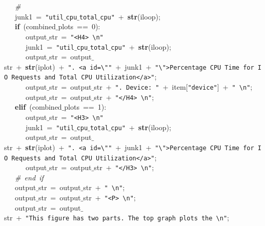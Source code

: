 \mbox{}\ \ \ \textit{\#} \\
\mbox{}\ \ \ junk1\ =\ \texttt{"{}util$\_$cpu$\_$total$\_$cpu"{}}\ +\ \textbf{str}(iloop); \\
\mbox{}\ \ \ \textbf{if}\ (combined$\_$plots\ ==\ 0): \\
\mbox{}\ \ \ \ \ \ output$\_$str\ =\ \texttt{"{}\textless{}H4\textgreater{}\ \textbackslash{}n"{}} \\
\mbox{}\ \ \ \ \ \ junk1\ =\ \texttt{"{}util$\_$cpu$\_$total$\_$cpu"{}}\ +\ \textbf{str}(iloop); \\
\mbox{}\ \ \ \ \ \ output$\_$str\ =\ output$\_$str\ +\ \textbf{str}(iplot)\ +\ \texttt{"{}.\ \textless{}a\ id=\textbackslash{}"{}"{}}\ +\ junk1\ +\ \texttt{"{}\textbackslash{}"{}\textgreater{}Percentage\ CPU\ Time\ for\ IO\ Requests\ and\ Total\ CPU\ Utilization\textless{}/a\textgreater{}"{}}; \\
\mbox{}\ \ \ \ \ \ output$\_$str\ =\ output$\_$str\ +\ \texttt{"{}.\ Device:\ "{}}\ +\ item[\texttt{"{}device"{}}]\ +\ \texttt{"{}\ \textbackslash{}n"{}}; \\
\mbox{}\ \ \ \ \ \ output$\_$str\ =\ output$\_$str\ +\ \texttt{"{}\textless{}/H4\textgreater{}\ \textbackslash{}n"{}}; \\
\mbox{}\ \ \ \textbf{elif}\ (combined$\_$plots\ ==\ 1): \\
\mbox{}\ \ \ \ \ \ output$\_$str\ =\ \texttt{"{}\textless{}H3\textgreater{}\ \textbackslash{}n"{}} \\
\mbox{}\ \ \ \ \ \ junk1\ =\ \texttt{"{}util$\_$cpu$\_$total$\_$cpu"{}}\ +\ \textbf{str}(iloop); \\
\mbox{}\ \ \ \ \ \ output$\_$str\ =\ output$\_$str\ +\ \textbf{str}(iplot)\ +\ \texttt{"{}.\ \textless{}a\ id=\textbackslash{}"{}"{}}\ +\ junk1\ +\ \texttt{"{}\textbackslash{}"{}\textgreater{}Percentage\ CPU\ Time\ for\ IO\ Requests\ and\ Total\ CPU\ Utilization\textless{}/a\textgreater{}"{}}; \\
\mbox{}\ \ \ \ \ \ output$\_$str\ =\ output$\_$str\ +\ \texttt{"{}\textless{}/H3\textgreater{}\ \textbackslash{}n"{}}; \\
\mbox{}\ \ \ \textit{\#\ end\ if} \\
\mbox{}\ \ \ output$\_$str\ =\ output$\_$str\ +\ \texttt{"{}\ \textbackslash{}n"{}}; \\
\mbox{}\ \ \ output$\_$str\ =\ output$\_$str\ +\ \texttt{"{}\textless{}P\textgreater{}\ \textbackslash{}n"{}}; \\
\mbox{}\ \ \ output$\_$str\ =\ output$\_$str\ +\ \texttt{"{}This\ figure\ has\ two\ parts.\ The\ top\ graph\ plots\ the\ \textbackslash{}n"{}}; \\
